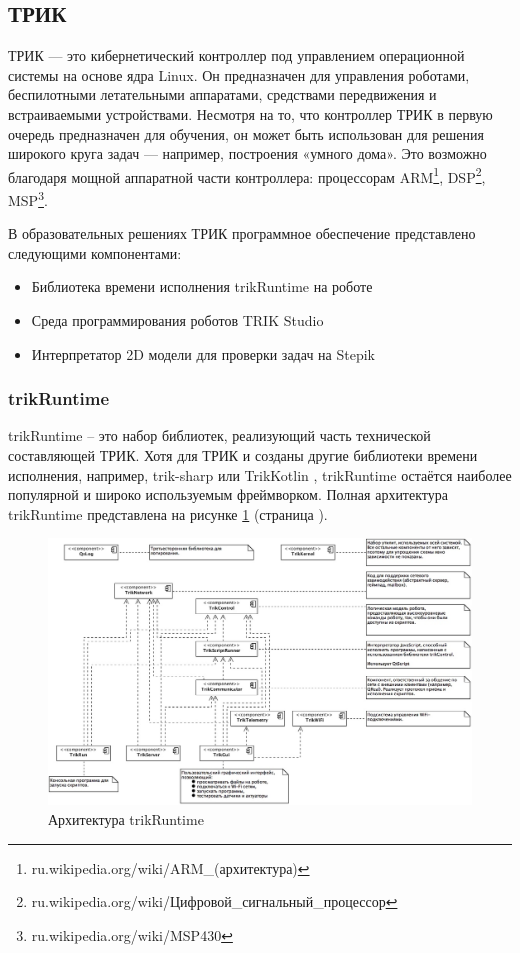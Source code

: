 \documentclass[14pt]{matmex-diploma-custom}
\begin{document}
\subsection{ТРИК}
ТРИК — это кибернетический контроллер под управлением операционной системы на основе ядра Linux. Он предназначен для управления роботами, беспилотными летательными аппаратами, средствами передвижения и встраиваемыми устройствами. Несмотря на то, что контроллер ТРИК в первую очередь предназначен для обучения, он может быть использован для решения широкого круга задач — например, построения «умного дома». Это возможно благодаря мощной аппаратной части контроллера: процессорам ARM\footnote{ru.wikipedia.org/wiki/ARM\_(архитектура)}, DSP\footnote{ru.wikipedia.org/wiki/Цифровой\_сигнальный\_процессор}, MSP\footnote{ru.wikipedia.org/wiki/MSP430}.

В образовательных решениях ТРИК программное обеспечение представлено следующими компонентами:
\begin{itemize}
    \item Библиотека времени исполнения trikRuntime на роботе
    \item Среда программирования роботов TRIK Studio
    \item Интерпретатор 2D модели для проверки задач на Stepik
\end{itemize}

\subsubsection{trikRuntime}
trikRuntime -- это набор библиотек, реализующий часть технической составляющей ТРИК. Хотя для ТРИК и созданы другие библиотеки времени исполнения, например, trik-sharp \cite{KirsanovSECR, KirsanovDiploma} или TrikKotlin \cite{BelkovYearlyProject}, trikRuntime остаётся наиболее популярной и широко используемым фреймворком. Полная архитектура trikRuntime представлена на рисунке \ref{trikRuntime} (страница \pageref{trikRuntime}).

\begin{figure}[h]
	\includegraphics[width=\textwidth]{images/trikRuntime.jpg}
	\caption{Архитектура trikRuntime}
	\label{trikRuntime}
\end{figure}
\end{document}
